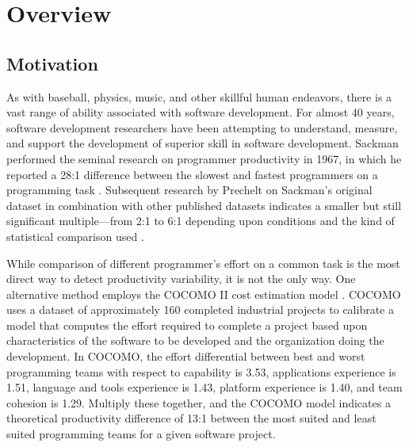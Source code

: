 
\section{Overview}

\subsection{Motivation}
As with baseball, physics, music, and other skillful human endeavors, there
is a vast range of ability associated with software development.  For
almost 40 years, software development researchers have been attempting to
understand, measure, and support the development of superior skill in
software development.  Sackman performed the seminal research on programmer
productivity in 1967, in which he reported a 28:1 difference between the
slowest and fastest programmers on a programming task \cite{Sackman68}.
Subsequent research by Prechelt on Sackman's original dataset in
combination with other published datasets indicates a smaller but still
significant multiple---from 2:1 to 6:1 depending upon conditions and the
kind of statistical comparison used \cite{Prechelt99}.

While comparison of different programmer's effort on a common task is the
most direct way to detect productivity variability, it is not the only way.
One alternative method employs the COCOMO II cost estimation model
\cite{Boehm00}. COCOMO uses a dataset of approximately 160 completed
industrial projects to calibrate a model that computes the effort required
to complete a project based upon characteristics of the software to be
developed and the organization doing the development.  In COCOMO, the
effort differential between best and worst programming teams with respect
to capability is 3.53, applications experience is 1.51, language and tools
experience is 1.43, platform experience is 1.40, and team cohesion is 1.29.
Multiply these together, and the COCOMO model indicates a theoretical
productivity difference of 13:1 between the most suited and least suited
programming teams for a given software project. 

